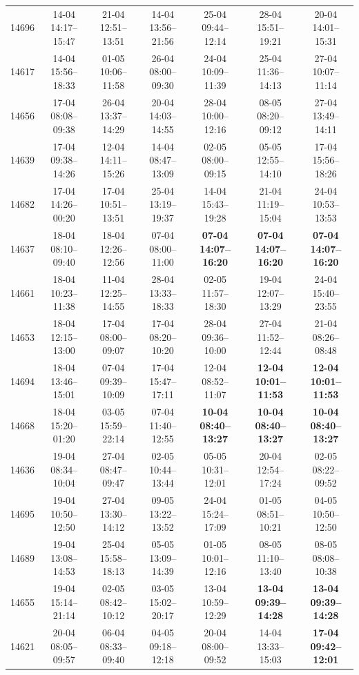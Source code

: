 \begin{table}[htbp]
\begin{tabular}{|r|c|c|c|c|c|c|}
14696 & 14-04 14:17--15:47 & 21-04 12:51--13:51 & 14-04 13:56--21:56 & 25-04 09:44--12:14 & 28-04 15:51--19:21 & 20-04 14:01--15:31 \\ 
14617 & 14-04 15:56--18:33 & 01-05 10:06--11:58 & 26-04 08:00--09:30 & 24-04 10:09--11:39 & 25-04 11:36--14:13 & 27-04 10:07--11:14 \\ 
14656 & 17-04 08:08--09:38 & 26-04 13:37--14:29 & 20-04 14:03--14:55 & 28-04 10:00--12:16 & 08-05 08:20--09:12 & 27-04 13:49--14:11 \\ 
14639 & 17-04 09:38--14:26 & 12-04 14:11--15:26 & 14-04 08:47--13:09 & 02-05 08:00--09:15 & 05-05 12:55--14:10 & 17-04 15:56--18:26 \\ 
14682 & 17-04 14:26--00:20 & 17-04 10:51--13:51 & 25-04 13:19--19:37 & 14-04 15:43--19:28 & 21-04 11:19--15:04 & 24-04 10:53--13:53 \\ 
14637 & 18-04 08:10--09:40 & 18-04 12:26--12:56 & 07-04 08:00--11:00 & \textbf{07-04 14:07--16:20} & \textbf{07-04 14:07--16:20} & \textbf{07-04 14:07--16:20} \\ 
14661 & 18-04 10:23--11:38 & 11-04 12:25--14:55 & 28-04 13:33--18:33 & 02-05 11:57--18:30 & 19-04 12:07--13:29 & 24-04 15:40--23:55 \\ 
14653 & 18-04 12:15--13:00 & 17-04 08:00--09:07 & 17-04 08:20--10:20 & 28-04 09:36--10:00 & 27-04 11:52--12:44 & 21-04 08:26--08:48 \\ 
14694 & 18-04 13:46--15:01 & 07-04 09:39--10:09 & 17-04 15:47--17:11 & 12-04 08:52--11:07 & \textbf{12-04 10:01--11:53} & \textbf{12-04 10:01--11:53} \\ 
14668 & 18-04 15:20--01:20 & 03-05 15:59--22:14 & 07-04 11:40--12:55 & \textbf{10-04 08:40--13:27} & \textbf{10-04 08:40--13:27} & \textbf{10-04 08:40--13:27} \\ 
14636 & 19-04 08:34--10:04 & 27-04 08:47--09:47 & 02-05 10:44--13:44 & 05-05 10:31--12:01 & 20-04 12:54--17:24 & 02-05 08:22--09:52 \\ 
14695 & 19-04 10:50--12:50 & 27-04 13:30--14:12 & 09-05 13:22--13:52 & 24-04 15:24--17:09 & 01-05 08:51--10:21 & 04-05 10:50--12:50 \\ 
14689 & 19-04 13:08--14:53 & 25-04 15:58--18:13 & 05-05 13:09--14:39 & 01-05 10:01--12:16 & 08-05 11:10--13:40 & 08-05 08:08--10:38 \\ 
14655 & 19-04 15:14--21:14 & 02-05 08:42--10:12 & 03-05 15:02--20:17 & 13-04 10:59--12:29 & \textbf{13-04 09:39--14:28} & \textbf{13-04 09:39--14:28} \\ 
14621 & 20-04 08:05--09:57 & 06-04 08:33--09:40 & 04-05 09:18--12:18 & 20-04 08:00--09:52 & 14-04 13:33--15:03 & \textbf{17-04 09:42--12:01} \\ 

\end{tabular}
\end{table}
